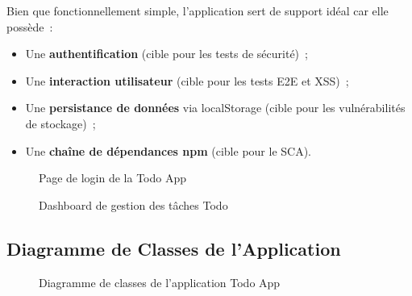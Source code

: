 Bien que fonctionnellement simple, l'application sert de support idéal car elle possède~:

\begin{itemize}
  \item Une \textbf{authentification} (cible pour les tests de sécurité)~;
  \item Une \textbf{interaction utilisateur} (cible pour les tests E2E et XSS)~;
  \item Une \textbf{persistance de données} via localStorage (cible pour les vulnérabilités
        de stockage)~;
  \item Une \textbf{chaîne de dépendances npm} (cible pour le SCA).
\end{itemize}

\begin{figure}[H]
    \centering
    \caption{Page de login de la Todo App}
    \label{fig:app_screenshot_login}
\end{figure}

\begin{figure}[H]
    \centering
    \caption{Dashboard de gestion des tâches Todo}
    \label{fig:app_screenshot_dashboard}
\end{figure}

\subsection{Diagramme de Classes de l'Application}

\begin{figure}[H]
    \centering
    \caption{Diagramme de classes de l'application Todo App}
    \label{fig:class_diagram}
\end{figure}


